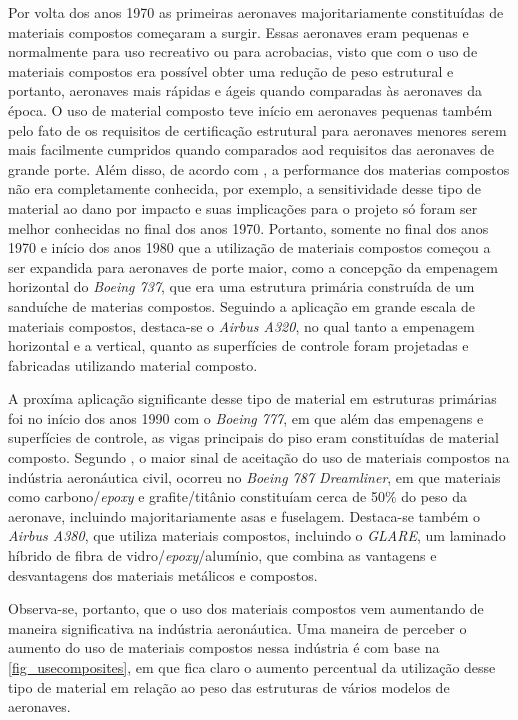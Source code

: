 Por volta dos anos 1970 as primeiras aeronaves majoritariamente constituídas de materiais compostos começaram a surgir. Essas aeronaves eram pequenas e normalmente para uso recreativo ou para acrobacias, visto que com o uso de materiais compostos era possível obter uma redução de peso estrutural e portanto, aeronaves mais rápidas e ágeis quando comparadas às aeronaves da época. O uso de material composto teve início em aeronaves pequenas também pelo fato de os requisitos de certificação estrutural para aeronaves menores serem mais facilmente cumpridos quando comparados aod requisitos das aeronaves de grande porte. Além disso, de acordo com \cite{kassapoglou2013design}, a performance dos materias compostos não era completamente conhecida, por exemplo, a sensitividade desse tipo de material ao dano por impacto e suas implicações para o projeto só foram ser melhor conhecidas no final dos anos 1970. Portanto, somente no final dos anos 1970 e início dos anos 1980 que a utilização de materiais compostos começou a ser expandida para aeronaves de porte maior, como a concepção da empenagem horizontal do \emph{Boeing 737}, que era uma estrutura primária construída de um sanduíche de materias compostos. Seguindo a aplicação em grande escala de materiais compostos, destaca-se o \emph{Airbus A320}, no qual tanto a empenagem horizontal e a vertical, quanto as superfícies de controle foram projetadas e fabricadas utilizando material composto.

A proxíma aplicação significante desse tipo de material em estruturas primárias foi no início dos anos 1990 com o \emph{Boeing 777}, em que além das empenagens e superfícies de controle, as vigas principais do piso eram constituídas de material composto.
Segundo \cite{daniel2006engineering}, o maior sinal de aceitação do uso de materiais compostos na indústria aeronáutica civil, ocorreu no \emph{Boeing 787 Dreamliner}, em que materiais como carbono/\emph{epoxy} e grafite/titânio constituíam cerca de 50\% do peso da aeronave, incluindo majoritariamente asas e fuselagem. Destaca-se também o \emph{Airbus A380}, que utiliza materiais compostos, incluindo o \emph{GLARE}, um laminado híbrido de fibra de vidro/\emph{epoxy}/alumínio, que combina as vantagens e desvantagens dos materiais metálicos e compostos.

Observa-se, portanto, que o uso dos materiais compostos vem aumentando de maneira significativa na indústria aeronáutica. Uma maneira de perceber o aumento do uso de materiais compostos nessa indústria é com base na \autoref{fig_usecomposites}, em que fica claro o aumento percentual da utilização desse tipo de material em relação ao peso das estruturas de vários modelos de aeronaves.

